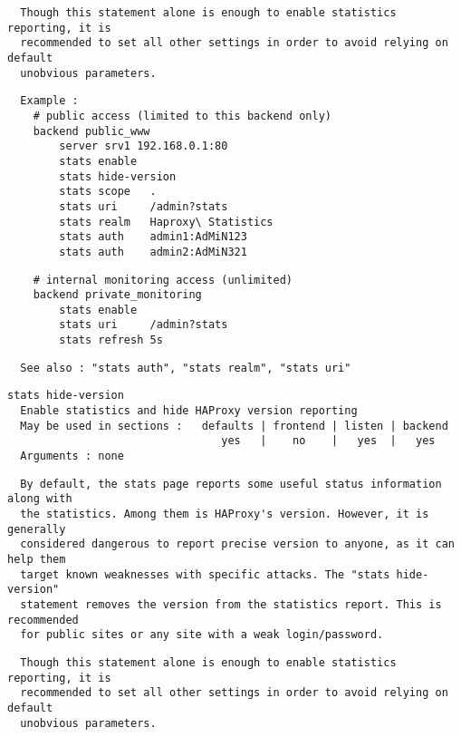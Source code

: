 \begin{verbatim}
  Though this statement alone is enough to enable statistics reporting, it is
  recommended to set all other settings in order to avoid relying on default
  unobvious parameters.
\end{verbatim}

\begin{verbatim}
  Example :
    # public access (limited to this backend only)
    backend public_www
        server srv1 192.168.0.1:80
        stats enable
        stats hide-version
        stats scope   .
        stats uri     /admin?stats
        stats realm   Haproxy\ Statistics
        stats auth    admin1:AdMiN123
        stats auth    admin2:AdMiN321
\end{verbatim}

\begin{verbatim}
    # internal monitoring access (unlimited)
    backend private_monitoring
        stats enable
        stats uri     /admin?stats
        stats refresh 5s
\end{verbatim}

\begin{verbatim}
  See also : "stats auth", "stats realm", "stats uri"
\end{verbatim}

\begin{verbatim}
stats hide-version
  Enable statistics and hide HAProxy version reporting
  May be used in sections :   defaults | frontend | listen | backend
                                 yes   |    no    |   yes  |   yes
  Arguments : none
\end{verbatim}

\begin{verbatim}
  By default, the stats page reports some useful status information along with
  the statistics. Among them is HAProxy's version. However, it is generally
  considered dangerous to report precise version to anyone, as it can help them
  target known weaknesses with specific attacks. The "stats hide-version"
  statement removes the version from the statistics report. This is recommended
  for public sites or any site with a weak login/password.
\end{verbatim}

\begin{verbatim}
  Though this statement alone is enough to enable statistics reporting, it is
  recommended to set all other settings in order to avoid relying on default
  unobvious parameters.
\end{verbatim}


